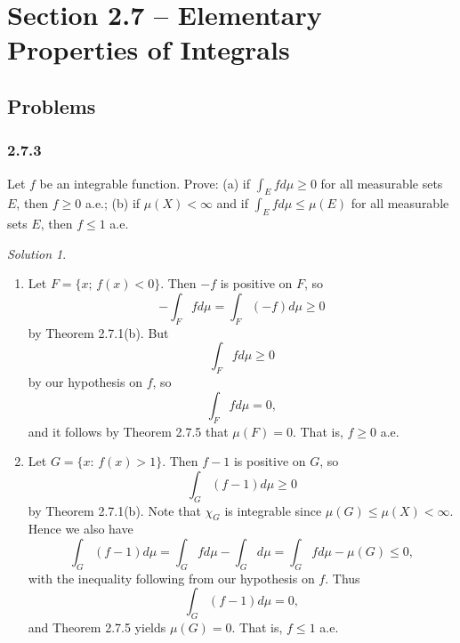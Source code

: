 \documentclass{report}
\theoremstyle{remark}
\newtheorem*{solution}{Solution}
\begin{document}
\section*{Section 2.7 -- Elementary Properties of Integrals}

\subsection*{Problems}

\subsubsection*{2.7.3}
Let $f$ be an integrable function. Prove: (a) if $\int_E f d\mu \ge 0$ for all measurable sets $E$, then $f \ge 0$ a.e.; (b) if $\mu(X) < \infty$ and if $\int_E f d\mu \le \mu(E)$ for all measurable sets $E$, then $f \le 1$ a.e.

\begin{solution}
  \leavevmode
  \begin{enumerate}[label=(\alph*)]
    \item Let $F = \{x; \, f(x) < 0\}$. Then $-f$ is positive on $F$, so
      \begin{equation*}
        -\int_F f d\mu = \int_F (-f) d\mu \ge 0
      \end{equation*}
      by Theorem 2.7.1(b). But
      \begin{equation*}
        \int_F f d\mu \ge 0
      \end{equation*}
      by our hypothesis on $f$, so
      \begin{equation*}
        \int_F f d\mu = 0,
      \end{equation*}
      and it follows by Theorem 2.7.5 that $\mu(F) = 0$. That is, $f \ge 0$ a.e.

    \item Let $G = \{x: \, f(x) > 1\}$. Then $f-1$ is positive on $G$, so
      \begin{equation*}
        \int_G (f-1) d\mu \ge 0
      \end{equation*}
      by Theorem 2.7.1(b). Note that $\chi_G$ is integrable since $\mu(G) \le \mu(X) < \infty$. Hence we also have
      \begin{equation*}
        \int_G (f-1) d\mu = \int_G f d\mu - \int_G d\mu = \int_G f d\mu - \mu(G) \le 0,
      \end{equation*}
      with the inequality following from our hypothesis on $f$. Thus
      \begin{equation*}
        \int_G (f-1) d\mu = 0,
      \end{equation*}
      and Theorem 2.7.5 yields $\mu(G) = 0$. That is, $f \le 1$ a.e.
  \end{enumerate}
\end{solution}
\end{document}
